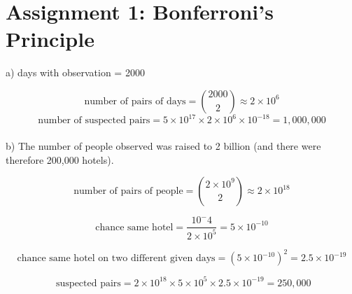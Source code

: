 \documentclass[]{scrartcl}
\begin{document}
%
%
%
%



\section*{Assignment 1: Bonferroni's Principle}


a) days with observation = 2000
	
\[\text{number of pairs of days} = \binom{2000}{2} \approx 2 \times 10^6 \]
\[\text{number of suspected pairs} = 5 \times 10^{17} \times 2 \times 10^6 \times 10^{-18} = 1,000,000 \]\\

	
	
b) The number of people observed was raised to 2 billion (and there were therefore 200,000 hotels).
	
\[	\text{number of pairs of people} = \binom{2 \times 10^9}{2} \approx 2 \times 10^{18} \]

\[ \text{chance same hotel} = \frac{10^-4}{2 \times 10^5} = 5 \times 10^{-10} \]

\[\text{chance same hotel on two different given days} = (5 \times 10^{-10})^2 = 2.5 \times 10^{-19} \]

\[ 	\text{ suspected pairs} = 2 \times 10^{18} \times 5 \times 10^5 \times 2.5 \times 10^{-19} = 250,000 \]\\
\end{document}
